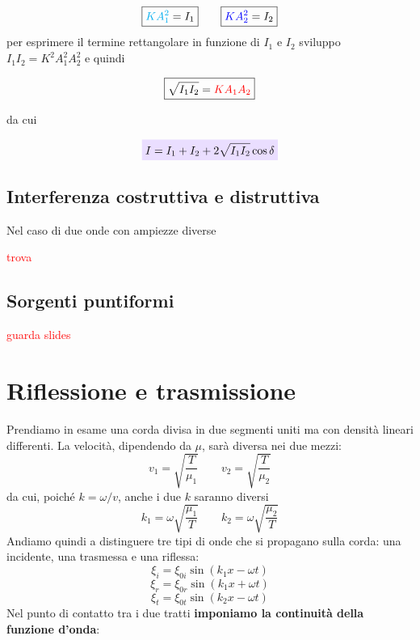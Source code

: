 \documentclass[x11names]{report}
\newcommand{\viola}[1]{\colorbox{yred}{$\displaystyle #1$}}
\begin{document}
	\[ 
	\boxed{\textcolor{cyan}{KA_1^2}= I_1} \qquad \boxed{\textcolor{blue}{KA_2^2} = I_2 } 
	\]
	per esprimere il termine rettangolare in funzione di \(I_1\) e \(I_2\) sviluppo \(I_1I_2 = K^2A_1^2A_2^2\) e quindi
	
	\[ 
	\boxed{\sqrt{I_1I_2} = \textcolor{red}{KA_1A_2}}
	\]
	
	da cui
	
	\begin{equation}
		\viola{I = I_1 + I_2 + 2\sqrt{I_1I_2}\cos\delta}
	\end{equation}
	
	
	\begin{es}{}
		\subsection{Interferenza costruttiva e distruttiva}
		Nel caso di due onde con ampiezze diverse 
		\begin{center}
			\textcolor{red}{trova}
		\end{center}
		
	\end{es}
	
	
	\subsection{Sorgenti puntiformi}
	\begin{center}
		\textcolor{red}{guarda slides}
	\end{center}
	
	\newpage
	\section{Riflessione e trasmissione}
	Prendiamo in esame una corda divisa in due segmenti uniti ma con densità lineari differenti. La velocità, dipendendo da \(\mu\), sarà diversa nei due mezzi:
	\[ 
	v_1 = \sqrt{\frac{T}{\mu_1}} \qquad v_2 = \sqrt{\frac{T}{\mu_2}} 
	\]
	da cui, poiché \(k = \omega / v\), anche i due \(k\) saranno diversi
	\[ 
	k_1 = \omega \sqrt{\frac{\mu_1}{T}} \qquad k_2 = \omega \sqrt{\frac{\mu_2}{T}} 
	\]
	Andiamo quindi a distinguere tre tipi di onde che si propagano sulla corda: una incidente, una trasmessa e una riflessa:
	\[ 
	\xi_i = \xi_{0i}\sin\left(k_1 x - \omega t\right)
	\]
	\[ 
	\xi_r = \xi_{0r}\sin\left(k_1 x + \omega t\right)
	\]
	\[ 
	\xi_t = \xi_{0t}\sin\left(k_2 x - \omega t\right)
	\]
	Nel punto di contatto tra i due tratti \textbf{imponiamo la continuità della funzione d'onda}:
	
\end{document}

